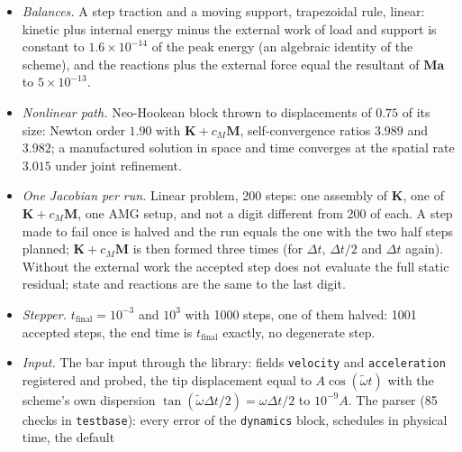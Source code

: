 \documentclass[11pt]{article}
\newcommand{\bK}{\bm{K}}
\newcommand{\bM}{\bm{M}}
\DeclareRobustCommand{\code}[1]{{\def\_{\textunderscore\allowbreak}\texttt{#1}}}
\DeclareRobustCommand{\file}[1]{{\def\_{\textunderscore\allowbreak}\texttt{#1}}}
\begin{document}
\begin{itemize}[nosep]
    trapezoidal rule keeps the energy to $3\times10^{-14}$ over 500 steps;
    with $\rho_\infty = 0.8$ the energy never exceeds its initial value (it
    is not monotone: the scheme dissipates in a norm of its own).  With
    $\omega\Delta t \gg 1$ for every mode, $\rho_\infty = 0$ leaves
    $10^{-32}$ of the energy after ten steps, $\rho_\infty = 0.5$ makes
    $\ln E_n$ fall with the slope $-1.331$ against $2\ln\rho_\infty =
    -1.386$ (the roots at infinity are a defective $-\rho_\infty$, hence a
    slope and not a ratio), and $\rho_\infty = 1$ keeps it to twelve digits:
    the parameter map of the family.
  \item \emph{Balances.}  A step traction and a moving support, trapezoidal
    rule, linear: kinetic plus internal energy minus the external work of
    load and support is constant to $1.6\times10^{-14}$ of the peak energy
    (an algebraic identity of the scheme), and the reactions plus the
    external force equal the resultant of $\bM\bm a$ to $5\times10^{-13}$.
  \item \emph{Nonlinear path.}  Neo-Hookean block thrown to displacements of
    $0.75$ of its size: Newton order $1.90$ with $\bK + c_M\bM$,
    self-convergence ratios $3.989$ and $3.982$; a manufactured solution in
    space and time converges at the spatial rate $3.015$ under joint
    refinement.
  \item \emph{One Jacobian per run.}  Linear problem, 200 steps: one
    assembly of $\bK$, one of $\bK + c_M\bM$, one AMG setup, and not a digit
    different from 200 of each.  A step made to fail once is halved and the
    run equals the one with the two half steps planned; $\bK + c_M\bM$ is
    then formed three times (for $\Delta t$, $\Delta t/2$ and $\Delta t$
    again).  Without the external work the accepted step does not evaluate
    the full static residual; state and reactions are the same to the last
    digit.
  \item \emph{Stepper.}  $t_{\text{final}} = 10^{-3}$ and $10^{3}$ with 1000
    steps, one of them halved: 1001 accepted steps, the end time is
    $t_{\text{final}}$ exactly, no degenerate step.
  \item \emph{Input.}  The bar input through the library: fields
    \code{velocity} and \code{acceleration} registered and probed, the tip
    displacement equal to $A\cos(\tilde\omega t)$ with the scheme's own
    dispersion $\tan(\tilde\omega\Delta t/2) = \omega\Delta t/2$ to
    $10^{-9}A$.  The parser (85 checks in \file{test\_base}): every error of
    the \code{dynamics} block, schedules in physical time, the default

\end{itemize}
\end{document}
